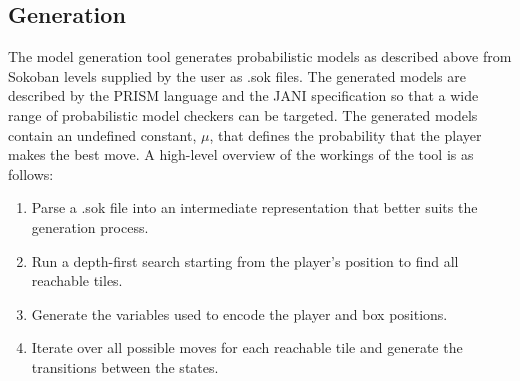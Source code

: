 \subsection{Generation}
The model generation tool generates probabilistic models as described above from Sokoban levels supplied by the user as .sok files. The generated models are described by the PRISM language and the JANI specification so that a wide range of probabilistic model checkers can be targeted. The generated models contain an undefined constant, $\mu$, that defines the probability that the player makes the best move. A high-level overview of the workings of the tool is as follows:
\begin{enumerate}
    \item Parse a .sok file into an intermediate representation that better suits the generation process.
    \item Run a depth-first search starting from the player's position to find all reachable tiles.
    \item Generate the variables used to encode the player and box positions.
    \item Iterate over all possible moves for each reachable tile and generate the transitions between the states.
\end{enumerate}
